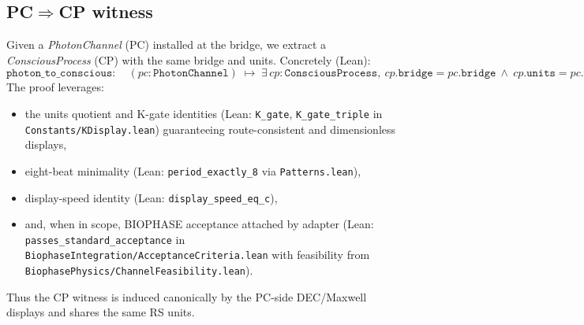 \documentclass[12pt,a4paper]{article}
\begin{document}
\subsection{PC\texorpdfstring{$\Rightarrow$}{⇒}CP witness}
Given a \emph{PhotonChannel} (PC) installed at the bridge, we extract a \emph{ConsciousProcess} (CP) with the same bridge and units. Concretely (Lean):
\[
  \texttt{photon\_to\_conscious} :
  \quad
  (pc:\texttt{PhotonChannel}) \;\mapsto\; \exists\,cp:\texttt{ConsciousProcess},\ 
  cp.\texttt{bridge}=pc.\texttt{bridge}\ \wedge\ cp.\texttt{units}=pc.\texttt{units}\ \wedge\ \texttt{WellFormed}(cp).
\]
The proof leverages:
\begin{itemize}
  \item the units quotient and K-gate identities (Lean: \texttt{K\_gate}, \texttt{K\_gate\_triple} in \texttt{Constants/KDisplay.lean}) guaranteeing route-consistent and dimensionless displays,
  \item eight-beat minimality (Lean: \texttt{period\_exactly\_8} via \texttt{Patterns.lean}),
  \item display-speed identity (Lean: \texttt{display\_speed\_eq\_c}),
  \item and, when in scope, BIOPHASE acceptance attached by adapter (Lean: \texttt{passes\_standard\_acceptance} in \texttt{BiophaseIntegration/AcceptanceCriteria.lean} with feasibility from \texttt{BiophasePhysics/ChannelFeasibility.lean}).
\end{itemize}
Thus the CP witness is induced canonically by the PC-side DEC/Maxwell displays and shares the same RS units.
\end{document}
